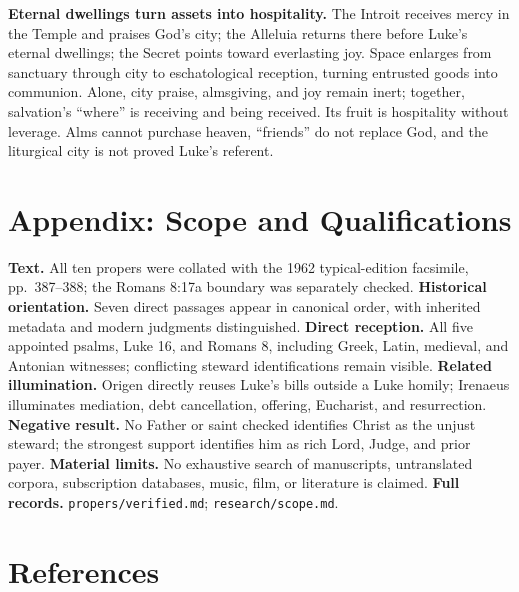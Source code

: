 \begin{deepstudy}
\noindent\textbf{Eternal dwellings turn assets into hospitality.\enspace{}}
The Introit receives mercy in the Temple and praises God's city; the Alleluia returns there before Luke's eternal dwellings; the Secret points toward everlasting joy. Space enlarges from sanctuary through city to eschatological reception, turning entrusted goods into communion. Alone, city praise, almsgiving, and joy remain inert; together, salvation's ``where'' is receiving and being received. Its fruit is hospitality without leverage. Alms cannot purchase heaven, ``friends'' do not replace God, and the liturgical city is not proved Luke's referent.

\clearpage

\section*{Appendix: Scope and Qualifications}

\begin{studyframe}
\textbf{Text.} All ten propers were collated with the 1962 typical-edition facsimile, pp.~387--388; the Romans 8:17a boundary was separately checked. \textbf{Historical orientation.} Seven direct passages appear in canonical order, with inherited metadata and modern judgments distinguished. \textbf{Direct reception.} All five appointed psalms, Luke 16, and Romans 8, including Greek, Latin, medieval, and Antonian witnesses; conflicting steward identifications remain visible. \textbf{Related illumination.} Origen directly reuses Luke's bills outside a Luke homily; Irenaeus illuminates mediation, debt cancellation, offering, Eucharist, and resurrection. \textbf{Negative result.} No Father or saint checked identifies Christ as the unjust steward; the strongest support identifies him as rich Lord, Judge, and prior payer. \textbf{Material limits.} No exhaustive search of manuscripts, untranslated corpora, subscription databases, music, film, or literature is claimed. \textbf{Full records.} \nolinkurl{propers/verified.md}; \nolinkurl{research/scope.md}.
\end{studyframe}

\section*{References}


\end{deepstudy}
